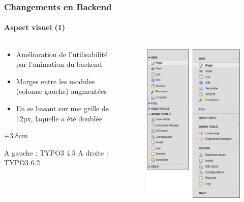 
\begin{frame}[fragile]
	\frametitle{Changements en Backend}
	\framesubtitle{Aspect visuel (1)}

	\begin{columns}[T]

		\begin{column}{.5\textwidth}
			\begin{itemize}
				\item Amélioration de l'utilisabilité par l'animation du backend
				\item Marges entre les modules (colonne gauche) augmentées
				\item En se basant sur une grille de 12px, laquelle a été doublée
			\end{itemize}

			\advance\leftskip+3.8cm

			\smaller
				A gauche : TYPO3 4.5\newline
				A droite : TYPO3 6.2
			\normalsize
		\end{column}

		\begin{column}{.5\textwidth}
			\begin{figure}\vspace*{-0.4cm}
				\includegraphics[width=0.6\linewidth]{Images/BackendChanges/VisualAppearance.png}
			\end{figure}
		\end{column}

	\end{columns}

\end{frame}

